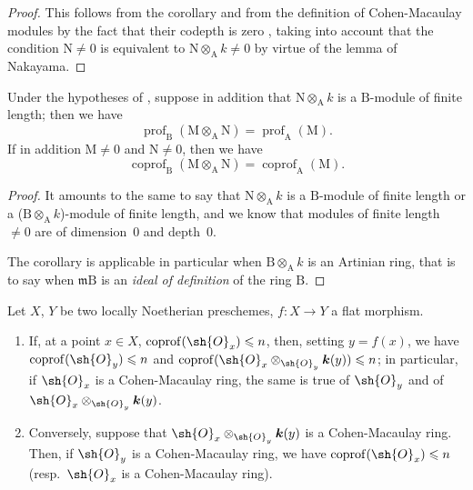 \begin{proof}
This follows from the corollary  and from the definition of Cohen-Macaulay modules by the fact that their codepth is zero , taking into account that the condition $\mathrm{N}\neq 0$ is equivalent to $\mathrm{N}\otimes_\mathrm{A} k\neq 0$ by virtue of the lemma of Nakayama.
\end{proof}

\begin{corollary}[6.3.4]
\label{IV.6.3.4}
Under the hypotheses of , suppose in addition that $\mathrm{N}\otimes_\mathrm{A} k$ is a $\mathrm{B}$-module of finite length; then we have
\begin{equation}
  \operatorname{prof}_\mathrm{B}(\mathrm{M}\otimes_\mathrm{A}\mathrm{N})=\operatorname{prof}_\mathrm{A}(\mathrm{M}).
  \label{IV.6.3.4.1}
\tag{6.3.4.1}
\end{equation}
If in addition $\mathrm{M}\neq 0$ and $\mathrm{N}\neq 0$, then we have
\begin{equation}
  \operatorname{coprof}_\mathrm{B}(\mathrm{M}\otimes_\mathrm{A}\mathrm{N})=\operatorname{coprof}_\mathrm{A}(\mathrm{M}).
  \label{IV.6.3.4.2}
\tag{6.3.4.2}
\end{equation}
\end{corollary}

\begin{proof}
It amounts to the same to say that $\mathrm{N}\otimes_\mathrm{A} k$ is a $\mathrm{B}$-module of finite length or a ($\mathrm{B}\otimes_\mathrm{A} k$)-module of finite length, and we know  that modules of finite length $\neq 0$ are of dimension~$0$ and depth~$0$.

The corollary  is applicable in particular when $\mathrm{B}\otimes_\mathrm{A} k$ is an Artinian ring, that is to say when $\mathfrak{m}\mathrm{B}$ is an \emph{ideal of definition} of the ring $\mathrm{B}$.
\end{proof}

\begin{corollary}[6.3.5]
\label{IV.6.3.5}
Let $X$, $Y$ be two locally Noetherian preschemes, $f:X\to Y$ a flat morphism.
\begin{enumerate}[label=(\roman*)]
  \item If, at a point $x\in X$, $\operatorname{coprof}(\sh{O}_x)\leqslant n$, then, setting $y=f(x)$, we have $\operatorname{coprof}(\sh{O}_y)\leqslant n$ and $\operatorname{coprof}(\sh{O}_x\otimes_{\sh{O}_y}\boldsymbol{k}(y))\leqslant n$; in particular, if $\sh{O}_x$ is a Cohen-Macaulay ring, the same is true of $\sh{O}_y$ and of $\sh{O}_x\otimes_{\sh{O}_y}\boldsymbol{k}(y)$.
  \item Conversely, suppose that $\sh{O}_x\otimes_{\sh{O}_y}\boldsymbol{k}(y)$ is a Cohen-Macaulay ring.
Then, if $\sh{O}_y$ is a Cohen-Macaulay ring, we have $\operatorname{coprof}(\sh{O}_x)\leqslant n$ \textnormal{(}resp.\ $\sh{O}_x$ is a Cohen-Macaulay ring\textnormal{)}.
\end{enumerate}
\end{corollary}

